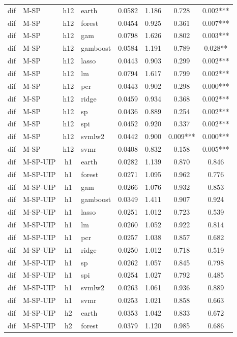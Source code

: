 \begin{ThreePartTable}
\begin{longtable}[t]{llclcccc}
dif & M-SP & h12 & earth & 0.0582 & 1.186 & 0.728 & 0.002***\\
dif & M-SP & h12 & forest & 0.0454 & 0.925 & 0.361 & 0.007***\\
dif & M-SP & h12 & gam & 0.0798 & 1.626 & 0.802 & 0.003***\\
dif & M-SP & h12 & gamboost & 0.0584 & 1.191 & 0.789 & 0.028**\\
dif & M-SP & h12 & lasso & 0.0443 & 0.903 & 0.299 & 0.002***\\
dif & M-SP & h12 & lm & 0.0794 & 1.617 & 0.799 & 0.002***\\
dif & M-SP & h12 & pcr & 0.0443 & 0.902 & 0.298 & 0.000***\\
dif & M-SP & h12 & ridge & 0.0459 & 0.934 & 0.368 & 0.002***\\
dif & M-SP & h12 & sp & 0.0436 & 0.889 & 0.254 & 0.002***\\
dif & M-SP & h12 & spi & 0.0452 & 0.920 & 0.337 & 0.002***\\
dif & M-SP & h12 & svmlw2 & 0.0442 & 0.900 & 0.009*** & 0.000***\\
dif & M-SP & h12 & svmr & 0.0408 & 0.832 & 0.158 & 0.005***\\
\addlinespace
dif & M-SP-UIP & h1 & earth & 0.0282 & 1.139 & 0.870 & 0.846\\
dif & M-SP-UIP & h1 & forest & 0.0271 & 1.095 & 0.962 & 0.776\\
dif & M-SP-UIP & h1 & gam & 0.0266 & 1.076 & 0.932 & 0.853\\
dif & M-SP-UIP & h1 & gamboost & 0.0349 & 1.411 & 0.907 & 0.924\\
dif & M-SP-UIP & h1 & lasso & 0.0251 & 1.012 & 0.723 & 0.539\\
dif & M-SP-UIP & h1 & lm & 0.0260 & 1.052 & 0.922 & 0.814\\
dif & M-SP-UIP & h1 & pcr & 0.0257 & 1.038 & 0.857 & 0.682\\
dif & M-SP-UIP & h1 & ridge & 0.0250 & 1.012 & 0.718 & 0.519\\
dif & M-SP-UIP & h1 & sp & 0.0262 & 1.057 & 0.845 & 0.798\\
dif & M-SP-UIP & h1 & spi & 0.0254 & 1.027 & 0.792 & 0.485\\
dif & M-SP-UIP & h1 & svmlw2 & 0.0263 & 1.061 & 0.936 & 0.889\\
dif & M-SP-UIP & h1 & svmr & 0.0253 & 1.021 & 0.858 & 0.663\\
\addlinespace
dif & M-SP-UIP & h2 & earth & 0.0353 & 1.042 & 0.833 & 0.672\\
dif & M-SP-UIP & h2 & forest & 0.0379 & 1.120 & 0.985 & 0.686\\

\end{longtable}
\end{ThreePartTable}
